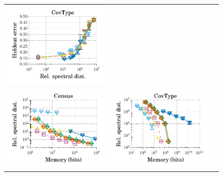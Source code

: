 \begin{figure}
\begin{tabular}{c c c}
		\includegraphics[width=0.4\linewidth]{figures/classification_acc_vs_delta_all_line.pdf} \\
		\includegraphics[width=0.4\linewidth]{figures/regression_delta_vs_mem_all_line.pdf} &
		\includegraphics[width=0.4\linewidth]{figures/classification_delta_vs_mem_all_line.pdf} \\
	\end{tabular}

\end{figure}

